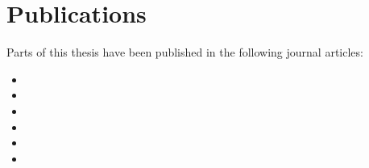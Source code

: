 \chapter{Publications}

Parts of this thesis have been published in the following journal articles:

\begin{itemize}
    \item {}
    \item {}
    \item {}
    \item {}
    \item {}
    \item {}
\end{itemize}
